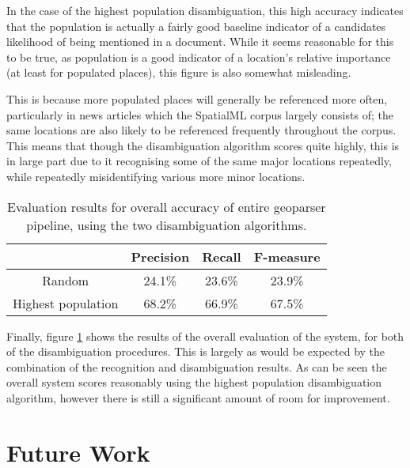\documentclass[12pt, a4paper]{report}
\begin{document}
In the case of the highest population disambiguation, this high accuracy indicates that the population is actually a fairly good baseline indicator of a candidates likelihood of being mentioned in a document. While it seems reasonable for this to be true, as population is a good indicator of a location's relative importance (at least for populated places), this figure is also somewhat misleading.

This is because more populated places will generally be referenced more often, particularly in news articles which the SpatialML corpus largely consists of; the same locations are also likely to be referenced frequently throughout the corpus. This means that though the disambiguation algorithm scores quite highly, this is in large part due to it recognising some of the same major locations repeatedly, while repeatedly misidentifying various more minor locations.

\begin{table}[H]
	\centering
	\begin{tabular}{| c | c | c | c |}
		\hline
		& Precision & Recall & F-measure \\ \hline
		Random & 24.1\% & 23.6\% & 23.9\% \\ \hline
		Highest population & 68.2\% & 66.9\% & 67.5\% \\ \hline
	\end{tabular}
	\caption{ Evaluation results for overall accuracy of entire geoparser pipeline, using the two disambiguation algorithms. }
	\label{table:overall}
\end{table}

Finally, figure \ref{table:overall}	shows the results of the overall evaluation of the system, for both of the disambiguation procedures. This is largely as would be expected by the combination of the recognition and disambiguation results. As can be seen the overall system scores reasonably using the highest population disambiguation algorithm, however there is still a significant amount of room for improvement.





\section{Future Work}
\label{sec:future_work}
\end{document}
